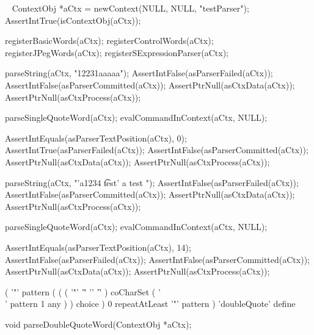 \CTestsSuiteSetup\
\startCTest
  ContextObj *aCtx = newContext(NULL, NULL, "testParser");
  AssertIntTrue(isContextObj(aCtx));
  
  registerBasicWords(aCtx);
  registerControlWords(aCtx);
  registerJPegWords(aCtx);
  registerSExpressionParser(aCtx);
\stopCTest

\startCTest
  parseString(aCtx, "12231aaaaa");
  AssertIntFalse(asParserFailed(aCtx));
  AssertIntFalse(asParserCommitted(aCtx));
  AssertPtrNull(asCtxData(aCtx));
  AssertPtrNull(asCtxProcess(aCtx));

  parseSingleQuoteWord(aCtx);
  evalCommandInContext(aCtx, NULL);
  
  AssertIntEquals(asParserTextPosition(aCtx), 0);
  AssertIntTrue(asParserFailed(aCtx));
  AssertIntFalse(asParserCommitted(aCtx));
  AssertPtrNull(asCtxData(aCtx));
  AssertPtrNull(asCtxProcess(aCtx));
\stopCTest
\stopTestCase

\startCTest
  parseString(aCtx, "'a1234 \t test' a test ");
  AssertIntFalse(asParserFailed(aCtx));
  AssertIntFalse(asParserCommitted(aCtx));
  AssertPtrNull(asCtxData(aCtx));
  AssertPtrNull(asCtxProcess(aCtx));
  
  parseSingleQuoteWord(aCtx);
  evalCommandInContext(aCtx, NULL);
  
  AssertIntEquals(asParserTextPosition(aCtx), 14);
  AssertIntFalse(asParserFailed(aCtx));
  AssertIntFalse(asParserCommitted(aCtx));
  AssertPtrNull(asCtxData(aCtx));
  AssertPtrNull(asCtxProcess(aCtx));
\stopCTest
\stopTestCase
\stopTestSuite

\startTestSuite[parseDoubleQuoteWord]

\starttyping
(
  '"' pattern
  ( 
    (
      ( '"' '\r' '\n' '\f' ) coCharSet
      ( '\\' pattern 1 any )
    ) choice
  ) 0 repeatAtLeast
  '"' pattern
) 'doubleQuote' define
\stoptyping

\startCHeader
void parseDoubleQuoteWord(ContextObj *aCtx);
\stopCHeader

